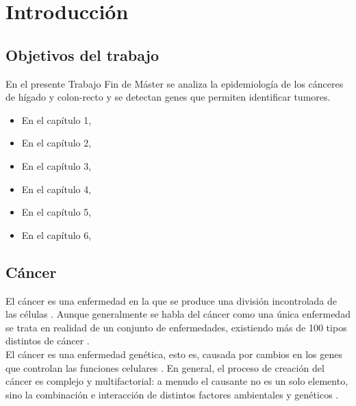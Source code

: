 \chapter{Introducción}

\section{Objetivos del trabajo}

En el presente Trabajo Fin de Máster se analiza la epidemiología de los cánceres de hígado y colon-recto y se detectan genes que permiten identificar tumores.

\begin{itemize}
	\item En el capítulo 1, 
	\item En el capítulo 2,
	\item En el capítulo 3,
	\item En el capítulo 4,
	\item En el capítulo 5,
	\item En el capítulo 6,
\end{itemize}


\section{Cáncer}

El cáncer es una enfermedad en la que se produce una división incontrolada de las células \cite{AmericanCancerSociety2015}. Aunque generalmente se habla del cáncer como una única enfermedad se trata en realidad de un conjunto de enfermedades, existiendo más de 100 tipos distintos de cáncer \cite{NationalCancerInstitute2015}.\\

El cáncer es una enfermedad genética, esto es, causada por cambios en los genes que controlan las funciones celulares \cite{NationalCancerInstitute2015}. En general, el proceso de creación del cáncer es complejo y multifactorial: a menudo el causante no es un solo elemento, sino la combinación e interacción de distintos factores ambientales y genéticos \cite{Migliore2012}.\\

